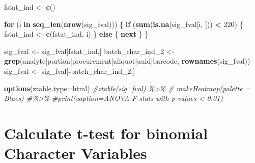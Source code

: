 \documentclass[
]{article}
\newenvironment{Shaded}{\begin{snugshade}}{\end{snugshade}}
\newcommand{\AttributeTok}[1]{\textcolor[rgb]{0.13,0.29,0.53}{#1}}
\newcommand{\CommentTok}[1]{\textcolor[rgb]{0.56,0.35,0.01}{\textit{#1}}}
\newcommand{\ControlFlowTok}[1]{\textcolor[rgb]{0.13,0.29,0.53}{\textbf{#1}}}
\newcommand{\DecValTok}[1]{\textcolor[rgb]{0.00,0.00,0.81}{#1}}
\newcommand{\FunctionTok}[1]{\textcolor[rgb]{0.13,0.29,0.53}{\textbf{#1}}}
\newcommand{\NormalTok}[1]{#1}
\newcommand{\OtherTok}[1]{\textcolor[rgb]{0.56,0.35,0.01}{#1}}
\newcommand{\SpecialCharTok}[1]{\textcolor[rgb]{0.81,0.36,0.00}{\textbf{#1}}}
\newcommand{\StringTok}[1]{\textcolor[rgb]{0.31,0.60,0.02}{#1}}
\begin{document}
\begin{Shaded}
\begin{Highlighting}[]
\NormalTok{fstat\_ind }\OtherTok{\textless{}{-}} \FunctionTok{c}\NormalTok{()}

\ControlFlowTok{for}\NormalTok{ (i }\ControlFlowTok{in} \FunctionTok{seq\_len}\NormalTok{(}\FunctionTok{nrow}\NormalTok{(sig\_fval))) \{}
  \ControlFlowTok{if}\NormalTok{ (}\FunctionTok{sum}\NormalTok{(}\FunctionTok{is.na}\NormalTok{(sig\_fval[i, ])) }\SpecialCharTok{\textless{}} \DecValTok{220}\NormalTok{) \{}
\NormalTok{    fstat\_ind }\OtherTok{\textless{}{-}} \FunctionTok{c}\NormalTok{(fstat\_ind, i)}
\NormalTok{  \} }\ControlFlowTok{else}\NormalTok{ \{}
    \ControlFlowTok{next}
\NormalTok{  \}}
\NormalTok{\}}

\NormalTok{sig\_fval }\OtherTok{\textless{}{-}}\NormalTok{ sig\_fval[fstat\_ind,]}
\NormalTok{batch\_char\_ind\_2 }\OtherTok{\textless{}{-}} \FunctionTok{grep}\NormalTok{(}\StringTok{\textquotesingle{}analyte|portion|procurement|aliquot|uuid|barcode\textquotesingle{}}\NormalTok{,}
                  \FunctionTok{rownames}\NormalTok{(sig\_fval))}
\NormalTok{sig\_fval }\OtherTok{\textless{}{-}}\NormalTok{ sig\_fval[}\SpecialCharTok{{-}}\NormalTok{batch\_char\_ind\_2,]}
\end{Highlighting}
\end{Shaded}

\begin{Shaded}
\begin{Highlighting}[]
\FunctionTok{options}\NormalTok{(}\AttributeTok{ztable.type=}\StringTok{\textquotesingle{}html\textquotesingle{}}\NormalTok{)}
\CommentTok{\#ztable(sig\_fval) \%\textgreater{}\%}
 \CommentTok{\# makeHeatmap(palette = \textquotesingle{}Blues\textquotesingle{}) \#\%\textgreater{}\%}
  \CommentTok{\#print(caption=\textquotesingle{}ANOVA F{-}stats with p{-}values \textless{} 0.01\textquotesingle{})}
\end{Highlighting}
\end{Shaded}

\hypertarget{calculate-t-test-for-binomial-character-variables}{%
\section{Calculate t-test for binomial Character
Variables}\label{calculate-t-test-for-binomial-character-variables}}
\end{document}
